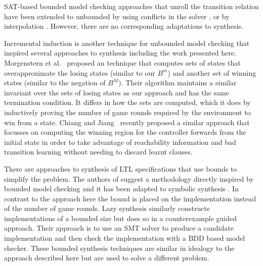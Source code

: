SAT-based bounded model checking approaches that unroll the transition relation
have been extended to unbounded by using conflicts in the solver
\cite{McMillan02}, or by interpolation \cite{McMillan03}. However, there
are no corresponding adaptations to synthesis.

Incremental induction \cite{Bradley11} is another technique for unbounded
model checking that inspired several approaches to synthesis including the work
presented here.  Morgenstern et al.~\cite{Morgenstern13} proposed an
technique that computes sets of states that overapproximate the losing states
(similar to our $B^m$) and another set of winning states (similar to the
negation of $B^M$).  Their algorithm maintains a similar invariant over the
sets of losing states as our approach and has the same termination condition.
It differs in how the sets are computed, which it does by inductively proving
the number of game rounds required by the environment to win from a state.
Chiang and Jiang~\cite{Chiang15} recently proposed a similar approach that
focusses on computing the winning region for the controller forwards from the
initial state in order to take advantage of reachability information and bad
transition learning without needing to discard learnt clauses.

There are approaches to synthesis of LTL specifications that use bounds to simplify the problem.  The authors of \cite{Finkbeiner13} suggest a methodology directly inspired by bounded model checking and it has been adapted to symbolic synthesis \cite{Ehlers12}. In contrast to the approach here the bound is placed on the implementation instead of the number of game rounds.  Lazy synthesis \cite{Finkbeiner12} similarly constructs implementations of a bounded size but does so in a counterexample guided approach. Their approach is to use an SMT solver to produce a candidate implementation and then check the implementation with a BDD based model checker. These bounded synthesis techniques are similar in idealogy to the approach described here but are used to solve a different problem.


